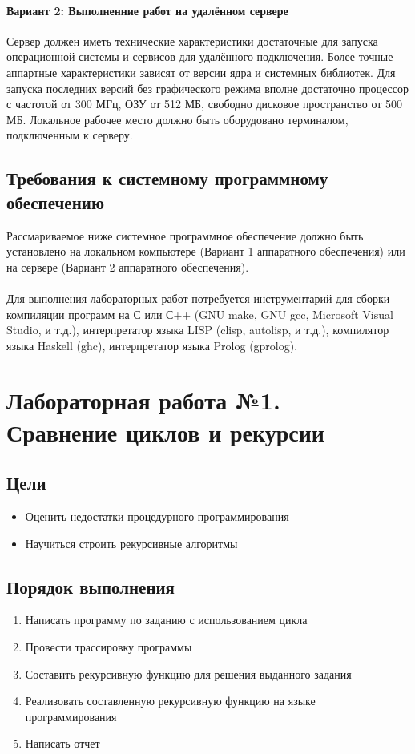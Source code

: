 \documentclass[a4paper,12pt]{article}
\begin{document}
\paragraph{Вариант 2: Выполненние работ на удалённом сервере}
Сервер должен иметь технические характеристики достаточные для запуска операционной системы и сервисов для удалённого подключения. Более точные аппартные характеристики зависят от версии ядра и системных библиотек. Для запуска последних версий без графического режима вполне достаточно процессор с частотой от 300 МГц, ОЗУ от 512 МБ, свободно дисковое пространство от 500 МБ. Локальное рабочее место должно быть оборудовано терминалом, подключенным к серверу.

\subsection{Требования к системному программному обеспечению}
Рассмариваемое ниже системное программное обеспечение должно быть установлено на локальном компьютере (Вариант 1 аппаратного обеспечения) или на сервере (Вариант 2 аппаратного обеспечения).
\paragraph{}
Для выполнения лабораторных работ потребуется инструментарий для сборки компиляции программ на С или С++ (GNU make, GNU gcc, Microsoft Visual Studio, и т.д.), интерпретатор языка LISP (clisp, autolisp, и т.д.), компилятор языка Haskell (ghc), интерпретатор языка Prolog (gprolog). 

\newpage
\section{Лабораторная работа №1.\\Сравнение циклов и рекурсии}
\subsection{Цели}
\begin{itemize}
	\item Оценить недостатки процедурного программирования
	\item Научиться строить рекурсивные алгоритмы
\end{itemize}

\subsection{Порядок выполнения}
\begin{enumerate}
	\item Написать программу по заданию с использованием цикла
	\item Провести трассировку программы
	\item Составить рекурсивную функцию для решения выданного задания
	\item Реализовать составленную рекурсивную функцию на языке программирования
	\item Написать отчет
\end{enumerate}
\end{document}
